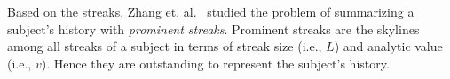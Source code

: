 Based on the streaks, Zhang et. al.~\cite{zhang2014discovering} studied the problem
of summarizing a subject's history with \emph{prominent streaks}. Prominent streaks
are the skylines among all streaks of a subject in terms of streak size (i.e., $L$) and analytic value (i.e., $\overline{v}$). Hence they are outstanding to represent the subject's history.
%
%
%
%
%
%
